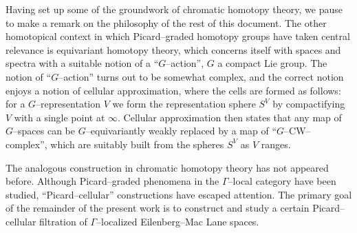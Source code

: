 \begin{remark}
Having set up some of the groundwork of chromatic homotopy theory, we pause to make a remark on the philosophy of the rest of this document.  The other homotopical context in which Picard--graded homotopy groups have taken central relevance is equivariant homotopy theory, which concerns itself with spaces and spectra with a suitable notion of a ``$G$--action'', $G$ a compact Lie group.  The notion of ``$G$--action'' turns out to be somewhat complex, and the correct notion enjoys a notion of cellular approximation, where the cells are formed as follows: for a $G$--representation $V$ we form the representation sphere $S^V$ by compactifying $V$ with a single point at $\infty$.  Cellular approximation then states that any map of $G$--spaces can be $G$--equivariantly weakly replaced by a map of ``$G$--CW--complex'', which are suitably built from the spheres $S^V$ as $V$ ranges.

The analogous construction in chromatic homotopy theory has not appeared before. Although Picard--graded phenomena in the $\Gamma$--local category have been studied, ``Picard--cellular'' constructions have escaped attention.  The primary goal of the remainder of the present work is to construct and study a certain Picard--cellular filtration of $\Gamma$--localized Eilenberg--Mac Lane spaces.
\end{remark}
